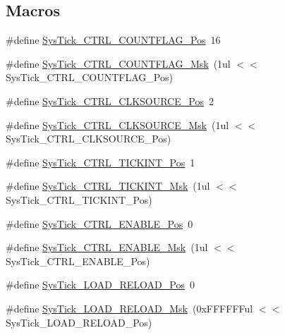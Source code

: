 \subsection*{Macros}
\begin{DoxyCompactItemize}
\item 
\#define \hyperlink{group__CMSIS__CM3__SysTick_gadbb65d4a815759649db41df216ed4d60}{Sys\+Tick\+\_\+\+C\+T\+R\+L\+\_\+\+C\+O\+U\+N\+T\+F\+L\+A\+G\+\_\+\+Pos}~16
\item 
\#define \hyperlink{group__CMSIS__CM3__SysTick_ga1bf3033ecccf200f59baefe15dbb367c}{Sys\+Tick\+\_\+\+C\+T\+R\+L\+\_\+\+C\+O\+U\+N\+T\+F\+L\+A\+G\+\_\+\+Msk}~(1ul $<$$<$ Sys\+Tick\+\_\+\+C\+T\+R\+L\+\_\+\+C\+O\+U\+N\+T\+F\+L\+A\+G\+\_\+\+Pos)
\item 
\#define \hyperlink{group__CMSIS__CM3__SysTick_ga24fbc69a5f0b78d67fda2300257baff1}{Sys\+Tick\+\_\+\+C\+T\+R\+L\+\_\+\+C\+L\+K\+S\+O\+U\+R\+C\+E\+\_\+\+Pos}~2
\item 
\#define \hyperlink{group__CMSIS__CM3__SysTick_gaa41d06039797423a46596bd313d57373}{Sys\+Tick\+\_\+\+C\+T\+R\+L\+\_\+\+C\+L\+K\+S\+O\+U\+R\+C\+E\+\_\+\+Msk}~(1ul $<$$<$ Sys\+Tick\+\_\+\+C\+T\+R\+L\+\_\+\+C\+L\+K\+S\+O\+U\+R\+C\+E\+\_\+\+Pos)
\item 
\#define \hyperlink{group__CMSIS__CM3__SysTick_ga88f45bbb89ce8df3cd2b2613c7b48214}{Sys\+Tick\+\_\+\+C\+T\+R\+L\+\_\+\+T\+I\+C\+K\+I\+N\+T\+\_\+\+Pos}~1
\item 
\#define \hyperlink{group__CMSIS__CM3__SysTick_ga95bb984266ca764024836a870238a027}{Sys\+Tick\+\_\+\+C\+T\+R\+L\+\_\+\+T\+I\+C\+K\+I\+N\+T\+\_\+\+Msk}~(1ul $<$$<$ Sys\+Tick\+\_\+\+C\+T\+R\+L\+\_\+\+T\+I\+C\+K\+I\+N\+T\+\_\+\+Pos)
\item 
\#define \hyperlink{group__CMSIS__CM3__SysTick_ga0b48cc1e36d92a92e4bf632890314810}{Sys\+Tick\+\_\+\+C\+T\+R\+L\+\_\+\+E\+N\+A\+B\+L\+E\+\_\+\+Pos}~0
\item 
\#define \hyperlink{group__CMSIS__CM3__SysTick_ga16c9fee0ed0235524bdeb38af328fd1f}{Sys\+Tick\+\_\+\+C\+T\+R\+L\+\_\+\+E\+N\+A\+B\+L\+E\+\_\+\+Msk}~(1ul $<$$<$ Sys\+Tick\+\_\+\+C\+T\+R\+L\+\_\+\+E\+N\+A\+B\+L\+E\+\_\+\+Pos)
\item 
\#define \hyperlink{group__CMSIS__CM3__SysTick_gaf44d10df359dc5bf5752b0894ae3bad2}{Sys\+Tick\+\_\+\+L\+O\+A\+D\+\_\+\+R\+E\+L\+O\+A\+D\+\_\+\+Pos}~0
\item 
\#define \hyperlink{group__CMSIS__CM3__SysTick_ga265912a7962f0e1abd170336e579b1b1}{Sys\+Tick\+\_\+\+L\+O\+A\+D\+\_\+\+R\+E\+L\+O\+A\+D\+\_\+\+Msk}~(0x\+F\+F\+F\+F\+F\+Ful $<$$<$ Sys\+Tick\+\_\+\+L\+O\+A\+D\+\_\+\+R\+E\+L\+O\+A\+D\+\_\+\+Pos)
$$
\end{DoxyCompactItemize}
